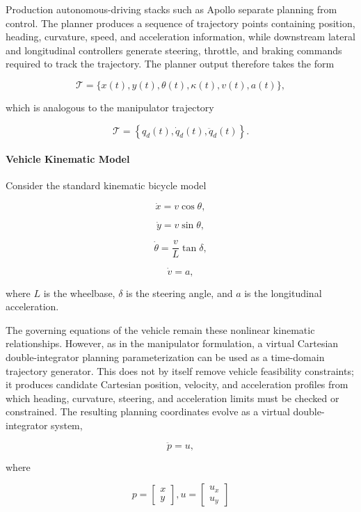 Production autonomous-driving stacks such as Apollo separate planning
from control. The planner produces a sequence of trajectory points
containing position, heading, curvature, speed, and acceleration
information, while downstream lateral and longitudinal controllers
generate steering, throttle, and braking commands required to track the
trajectory. The planner output therefore takes the form

\[
\mathcal T = \{ x(t), y(t),\theta(t),\kappa(t),v(t),a(t) \},
\]

which is analogous to the manipulator trajectory

\[ \mathcal T = \left \{ q_d(t), \dot q_d(t), \ddot q_d(t) \right \}. \]

\paragraph{Vehicle Kinematic Model}\label{vehicle-kinematic-model}

Consider the standard kinematic bicycle model

\[ \dot x = v \cos\theta, \]

\[ \dot y = v \sin\theta, \]

\[\dot\theta = \frac{v}{L}\tan\delta,\]

\[ \dot v = a, \]

where \(L\) is the wheelbase, \(\delta\) is the steering angle, and
\(a\) is the longitudinal acceleration.

The governing equations of the vehicle remain these nonlinear kinematic
relationships. However, as in the manipulator formulation, a virtual
Cartesian double-integrator planning parameterization can be used as a
time-domain trajectory generator. This does not by itself remove vehicle
feasibility constraints; it produces candidate Cartesian position,
velocity, and acceleration profiles from which heading, curvature,
steering, and acceleration limits must be checked or constrained. The
resulting planning coordinates evolve as a virtual double-integrator
system,

\[ \ddot p = u, \]

where

\[ p = \begin{bmatrix} x\\ y \end{bmatrix},
u = \begin{bmatrix} u_x \\ u_y \end{bmatrix}\]

